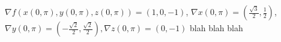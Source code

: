 {
$\nabla f(x(0,\pi),y(0,\pi), z(0,\pi)) = (1,0,-1)$, $\nabla x(0,\pi) =(\frac{\sqrt{3}}{2},\frac{1}{2})$, $\nabla y(0,\pi) = (-\frac{\sqrt{2}}{2},\frac{\sqrt{2}}{2}), \nabla z(0,\pi) = (0,-1)$
}
{
blah blah blah
}
